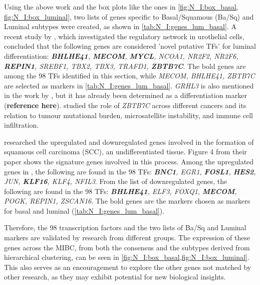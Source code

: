 Using the above work and the box plots like the ones in \cref{fig:N_I:box_basal, fig:N_I:box_luminal}, two lists of genes specific to Basal/Squamous (Ba/Sq) and Luminal subtypes were created, as shown in \cref{tab:N_I:genes_lum_basal}. A recent study by \citet{Ramal2024-ha}, which investigated the regulatory network in urothelial cells, concluded that the following genes are considered 'novel putative TFs' for luminal differentiation: \textit{\textbf{BHLHE41}, \textbf{MECOM}, \textbf{MYCL}, NCOA1, NR2F2, NR2F6, \textbf{REPIN1}, SREBF1, TBX2, TBX3, TRAFD1, \textbf{ZBTB7C}}. The bold genes are among the 98 TFs identified in this section, while \textit{MECOM, BHLHE41, ZBTB7C} are selected as markers in \cref{tab:N_I:genes_lum_basal}. \textit{GRHL3} is also mentioned in the work by \citet{Ramal2024-ha}, but it has already been determined as a differentiation marker (\textbf{reference here}). \citet{Chen2021-tc} studied the role of \textit{ZBTB7C} across different cancers and its relation to tumour mutational burden, microsatellite instability, and immune cell infiltration.

\citet{Hurst2022-sp} researched the upregulated and downregulated genes involved in the formation of squamous cell carcinoma (SCC), an undifferentiated tissue. Figure 4 from their paper shows the signature genes involved in this process. Among the upregulated genes in \citet{Hurst2022-sp}, the following are found in the 98 TFs: \textit{\textbf{BNC1}, EGR1, \textbf{FOSL1}, \textbf{HES2}, JUN, \textbf{KLF16}, KLF4, NFIL3}. From the list of downregulated genes, the following are found in the 98 TFs: \textit{\textbf{BHLHE41}, ELF3, FOXQ1, \textbf{MECOM}, POGK, REPIN1, ZSCAN16}. The bold genes are the markers chosen as markers for basal and luminal (\cref{tab:N_I:genes_lum_basal}).

Therefore, the 98 transcription factors and the two lists of Ba/Sq and Luminal markers are validated by research from different groups. The expression of these genes across the MIBC, from both the consensus and the subtypes derived from hierarchical clustering, can be seen in \cref{fig:N_I:box_basal,fig:N_I:box_luminal}. This also serves as an encouragement to explore the other genes not matched by other research, as they may exhibit potential for new biological insights.

